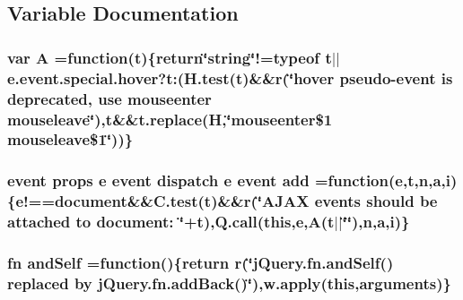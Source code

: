 \subsection{Variable Documentation}
\hypertarget{jquery-migrate-1_82_81_8min_8js_a9757042cb6157b0f84e78a5ff4aa6f93}{}
\subsubsection[{A}]{\setlength{\rightskip}{0pt plus 5cm}var A =function({\bf t})\{return\char`\"{}string\char`\"{}!=typeof {\bf t}$\vert$$\vert$e.\+event.\+special.\+hover?t\+:(H.\+test({\bf t})\&\&{\bf r}(\char`\"{}\textquotesingle{}hover\textquotesingle{} pseudo-\/{\bf event} is deprecated, use \textquotesingle{}mouseenter mouseleave\textquotesingle{}\char`\"{}),t\&\&t.\+replace({\bf H},\char`\"{}mouseenter\$1 mouseleave\$1\char`\"{}))\}}\label{jquery-migrate-1_82_81_8min_8js_a9757042cb6157b0f84e78a5ff4aa6f93}
\hypertarget{jquery-migrate-1_82_81_8min_8js_adfc2a3f1403063f39278226a02571631}{}
\subsubsection[{add}]{ {\bf event} props {\bf e} {\bf event} {\bf dispatch} {\bf e} {\bf event} add =function({\bf e},{\bf t},{\bf n},{\bf a},{\bf i})\{e!==document\&\&C.\+test({\bf t})\&\&{\bf r}(\char`\"{}A\+J\+A\+X events should be attached to document\+: \char`\"{}+t),{\bf Q.\+call}({\bf this},{\bf e},{\bf A}({\bf t}$\vert$$\vert$\char`\"{}\char`\"{}),{\bf n},{\bf a},{\bf i})\}}\label{jquery-migrate-1_82_81_8min_8js_adfc2a3f1403063f39278226a02571631}
\hypertarget{jquery-migrate-1_82_81_8min_8js_a87feebad0d5e7f093f60e89bd1135092}{}
\subsubsection[{and\+Self}]{ {\bf fn} and\+Self =function()\{return {\bf r}(\char`\"{}j\+Query.\+fn.\+and\+Self() replaced {\bf by} j\+Query.\+fn.\+add\+Back()\char`\"{}),w.\+apply({\bf this},arguments)\}}\label{jquery-migrate-1_82_81_8min_8js_a87feebad0d5e7f093f60e89bd1135092}
\hypertarget{jquery-migrate-1_82_81_8min_8js_a571977117149de472ef2f4cd0087bc92}{}
